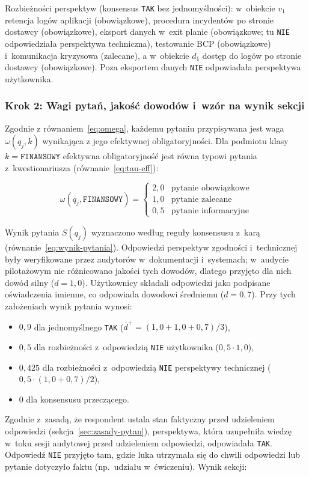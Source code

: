 \noindent Rozbieżności perspektyw (konsensus \texttt{TAK} bez jednomyślności): w~obiekcie $v_1$ retencja logów aplikacji (obowiązkowe), procedura incydentów po stronie dostawcy (obowiązkowe), eksport danych w~exit planie (obowiązkowe; tu \texttt{NIE} odpowiedziała perspektywa techniczna), testowanie BCP (obowiązkowe) i~komunikacja kryzysowa (zalecane), a w~obiekcie $d_1$ dostęp do logów po stronie dostawcy (obowiązkowe). Poza eksportem danych \texttt{NIE} odpowiadała perspektywa użytkownika.

\subsubsection*{Krok 2: Wagi pytań, jakość dowodów i~wzór na wynik sekcji}

Zgodnie z równaniem~\eqref{eq:omega}, każdemu pytaniu przypisywana jest waga $\omega(q_j, k)$ wynikająca z jego efektywnej obligatoryjności. Dla podmiotu klasy $k = \texttt{FINANSOWY}$ efektywna obligatoryjność jest równa typowi pytania z~kwestionariusza (równanie~\eqref{eq:tau-eff}):

\[
\omega(q_j, \texttt{FINANSOWY}) =
\begin{cases}
2{,}0 & \text{pytanie obowiązkowe} \\
1{,}0 & \text{pytanie zalecane} \\
0{,}5 & \text{pytanie informacyjne}
\end{cases}
\]

Wynik pytania $S(q_j)$ wyznaczono według reguły konsensusu z~karą (równanie~\eqref{eq:wynik-pytania}). Odpowiedzi perspektyw zgodności i~technicznej były weryfikowane przez audytorów w~dokumentacji i~systemach; w~audycie pilotażowym nie różnicowano jakości tych dowodów, dlatego przyjęto dla nich dowód silny ($d = 1{,}0$). Użytkownicy składali odpowiedzi jako podpisane oświadczenia imienne, co odpowiada dowodowi średniemu ($d = 0{,}7$). Przy tych założeniach wynik pytania wynosi:
\begin{itemize}
  \item $0{,}9$ dla jednomyślnego \texttt{TAK} ($\bar{d}^{+} = (1{,}0 + 1{,}0 + 0{,}7)/3$),
  \item $0{,}5$ dla rozbieżności z~odpowiedzią \texttt{NIE} użytkownika ($0{,}5 \cdot 1{,}0$),
  \item $0{,}425$ dla rozbieżności z~odpowiedzią \texttt{NIE} perspektywy technicznej ($0{,}5 \cdot (1{,}0 + 0{,}7)/2$),
  \item $0$ dla konsensusu przeczącego.
\end{itemize}
Zgodnie z~zasadą, że respondent ustala stan faktyczny przed udzieleniem odpowiedzi (sekcja~\ref{sec:zasady-pytan}), perspektywa, która uzupełniła wiedzę w~toku sesji audytowej przed udzieleniem odpowiedzi, odpowiadała \texttt{TAK}. Odpowiedź \texttt{NIE} przyjęto tam, gdzie luka utrzymała się do chwili odpowiedzi lub pytanie dotyczyło faktu (np.\ udziału w~ćwiczeniu). Wynik sekcji:

